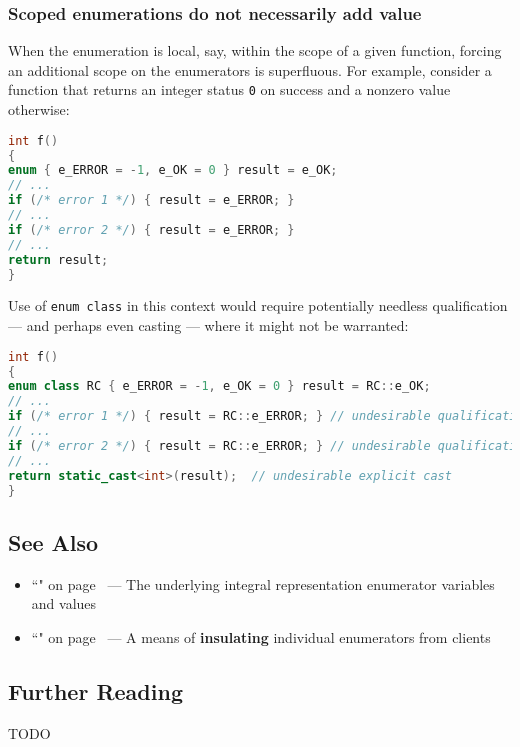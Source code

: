 \subsubsection[Scoped enumerations do not necessarily add value]{Scoped enumerations do not necessarily add value}\label{scoped-enumerations-do-not-necessarily-add-value}

When the enumeration is local, say, within the scope of a given
function, forcing an additional scope on the enumerators is superfluous.
For example, consider a function that returns an integer status
\texttt{0} on success and a nonzero value otherwise:

\begin{lstlisting}[language=C++]
int f()
{
enum { e_ERROR = -1, e_OK = 0 } result = e_OK;
// ...
if (/* error 1 */) { result = e_ERROR; }
// ...
if (/* error 2 */) { result = e_ERROR; }
// ...
return result;
}
\end{lstlisting}

\noindent Use of \texttt{enum}~\texttt{class} in this context would require
potentially needless qualification --- and perhaps even casting ---
where it might not be warranted:

\begin{lstlisting}[language=C++]
int f()
{
enum class RC { e_ERROR = -1, e_OK = 0 } result = RC::e_OK;
// ...
if (/* error 1 */) { result = RC::e_ERROR; } // undesirable qualification
// ...
if (/* error 2 */) { result = RC::e_ERROR; } // undesirable qualification
// ...
return static_cast<int>(result);  // undesirable explicit cast
}
\end{lstlisting}

\subsection[See Also]{See Also}\label{see-also}

\begin{itemize}
\item{``" on page~\pageref{explicit-enumeration-underlying-type} --- The underlying integral representation enumerator variables and values}
\item{``" on page~\pageref{enumopaque} --- A means of \textbf{insulating} individual enumerators from clients}
\end{itemize}

\subsection[Further Reading]{Further Reading}\label{further-reading}

TODO
